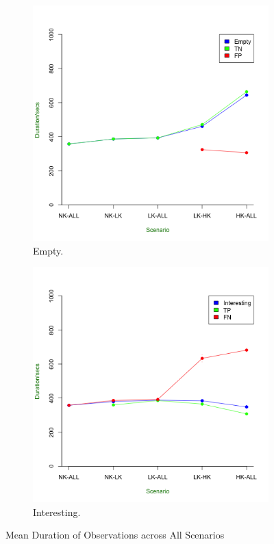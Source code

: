 	\begin{figure}[h]
	\centering
		\begin{subfigure}{.5\textwidth}
		\includegraphics[width=\textwidth]{Chap7/figures/saturated/empty_dur}
		\caption{Empty.}
		\label{fig:sat:empty:dur}
		\end{subfigure}

		\begin{subfigure}{.5\textwidth}
		\includegraphics[width=textwidth]{Chap7/figures/saturated/int_dur}
		\caption{Interesting.}
		\label{fig:sat:int:dur}
		\end{subfigure}
	\caption{Mean Duration of Observations across All Scenarios}
	\end{figure}

